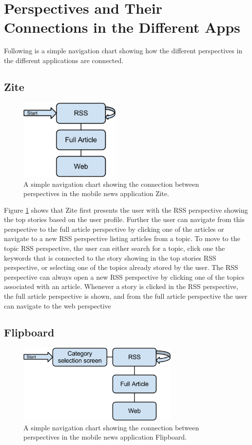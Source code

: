 \section{Perspectives and Their Connections in the Different Apps}
Following is a simple navigation chart showing how the different perspectives in the different applications are connected.

\subsection{Zite}

\begin{figure}[!htbp]
\centering
\includegraphics[width=50mm]{GFX/statecharts/Zite.png}
\caption{A simple navigation chart showing the connection between perspectives in the mobile news application Zite.}
\label{state_chart_zite}
\end{figure}

Figure \ref{state_chart_zite} shows that Zite first presents the user with the RSS perspective showing the top stories based on the user profile. Further the user can navigate from this perspective to the full article perspective by clicking one of the articles or navigate to a new RSS perspective listing articles from a topic. To move to the topic RSS perspective, the user can either search for a topic, click one the keywords that is connected to the story showing in the top stories RSS perspective, or selecting one of the topics already stored by the user. The RSS perspective can always open a new RSS perspective by clicking one of the topics associated with an article. Whenever a story is clicked in the RSS perspective, the full article perspective is shown, and from the full article perspective the user can navigate to the web perspective

\subsection{Flipboard}

\begin{figure}[!htbp]
\centering
\includegraphics[width=80mm]{GFX/statecharts/Flipboard.png}
\caption{A simple navigation chart showing the connection between perspectives in the mobile news application Flipboard.}
\label{state_chart_flipboard}
\end{figure}

